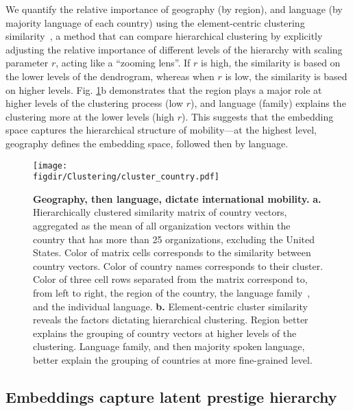 \documentclass[12pt]{article} %
\def\figdir{../Figs}
\begin{document}
We quantify the relative importance of geography (by region), and language (by majority language of each country) using the element-centric clustering similarity~\autocite{gates2019element}, a method that can compare hierarchical clustering by explicitly adjusting the relative importance of different levels of the hierarchy with scaling parameter $r$, acting like a ``zooming lens''.
If $r$ is high, the similarity is based on the lower levels of the dendrogram, whereas when $r$ is low, the similarity is based on higher levels.
Fig. \ref{fig:clustering}b demonstrates that the region plays a major role at higher levels of the clustering process (low $r$), and language (family) explains the clustering more at the lower levels (high $r$).
This suggests that the embedding space captures the hierarchical structure of mobility---at the highest level, geography defines the embedding space, followed then by language.


%
%
\begin{figure}[p!]
	\centering
	\texttt{[image: \\figdir/Clustering/cluster\_country.pdf]}
	\caption{
		\textbf{Geography, then language, dictate international mobility.}
		\textbf{a.} Hierarchically clustered similarity matrix of country vectors, aggregated as the mean of all organization vectors within the country that has more than 25 organizations, excluding the United States.
		Color of matrix cells corresponds to the similarity between country vectors.
		Color of country names corresponds to their cluster.
		Color of three cell rows separated from the matrix correspond to, from left to right, the region of the country, the language family~\autocite{ethnologue}, and the individual language.
		\textbf{b.}	Element-centric cluster similarity~\autocite{gates2019element} reveals the factors dictating hierarchical clustering.
		Region better explains the grouping of country vectors at higher levels of the clustering.
		Language family, and then majority spoken language, better explain the grouping of countries at more fine-grained level.
	}
	\label{fig:clustering}
\end{figure}



%
%
\subsection*{Embeddings capture latent prestige hierarchy}
\end{document}
